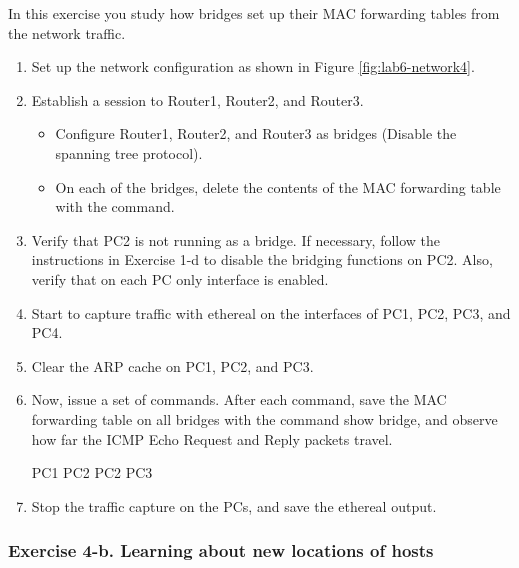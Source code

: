 In this exercise you study how bridges set up their MAC forwarding tables from the network traffic.
\begin{enumerate}
	\item Set up the network configuration as shown in Figure \ref{fig:lab6-network4}.
	\item Establish a  session to Router1, Router2, and Router3.
		\begin{itemize}
			\item Configure Router1, Router2, and Router3 as bridges (Disable the spanning tree protocol).
			\item On each of the bridges, delete the contents of the MAC forwarding table with the  command.
		\end{itemize}
	\item Verify that PC2 is not running as a bridge. If necessary, follow the instructions in Exercise 1-d to disable the bridging functions on PC2. Also, verify that on each PC only interface  is enabled.
	\item Start to capture traffic with ethereal on the  interfaces of PC1, PC2, PC3, and PC4.
	\item Clear the ARP cache on PC1, PC2, and PC3.
	\item Now, issue a set of  commands. After each command, save the MAC forwarding table on all bridges with the command show bridge, and observe how far the ICMP Echo Request and Reply packets travel.
		\begin{cmdblock}
	PC1%
	PC2%
	PC2%
	PC3%
		\end{cmdblock}
	\item Stop the traffic capture on the PCs, and save the ethereal output.
\end{enumerate}

\begin{questions}
\end{questions}

\subsubsection{Exercise 4-b. Learning about new locations of hosts}

